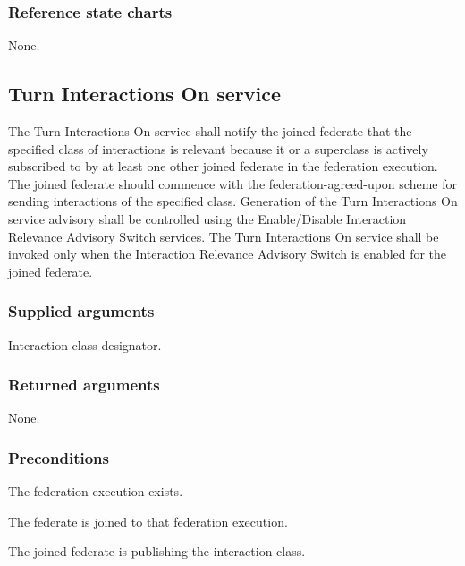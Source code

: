 \begin{compactstdpage}
    \subsubsection{Reference state charts}
    \begin{stdalphalist}
        \item None.
    \end{stdalphalist}

    \subsection{Turn Interactions On \rtiinitiated{} service}

    The Turn Interactions On \rtiinitiated{} service shall notify the joined federate that the specified class of interactions is relevant because it or a superclass is actively subscribed to by at least one other joined federate in the federation execution. The joined federate should commence with the federation-agreed-upon scheme for sending interactions of the specified class. Generation of the Turn Interactions On \rtiinitiated{} service advisory shall be controlled using the Enable/Disable Interaction Relevance Advisory Switch services. The Turn Interactions On \rtiinitiated{} service shall be invoked only when the Interaction Relevance Advisory Switch is enabled for the joined federate.

    \subsubsection{Supplied arguments}
    \begin{stdalphalist}
        \item Interaction class designator.
    \end{stdalphalist}

    \subsubsection{Returned arguments}
    \begin{stdalphalist}
        \item None.
    \end{stdalphalist}

    \subsubsection{Preconditions}
    \begin{stdalphalist}
        \item The federation execution exists.
        \item The federate is joined to that federation execution.
        \item The joined federate is publishing the interaction class.
    \end{stdalphalist}
\end{compactstdpage}

